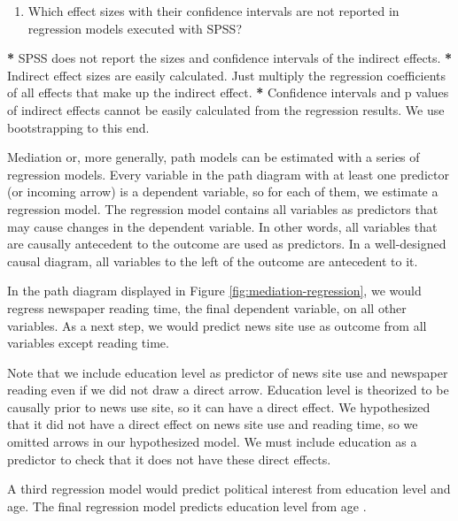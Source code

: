 \documentclass[a4paper]{book}
\newenvironment{Shaded}{\begin{snugshade}}{\end{snugshade}}
\newcommand{\StringTok}[1]{\textcolor[rgb]{0.00,0.00,0.00}{#1}}
\newcommand{\OperatorTok}[1]{\textcolor[rgb]{0.00,0.00,0.00}{\textbf{#1}}}
\newcommand{\NormalTok}[1]{#1}
\providecommand{\tightlist}{%
  \setlength{\itemsep}{0pt}\setlength{\parskip}{0pt}}
\theoremstyle{definition}
\theoremstyle{definition}
\theoremstyle{definition}
\theoremstyle{remark}
\begin{document}
\begin{enumerate}
\def\labelenumi{\arabic{enumi}.}
\setcounter{enumi}{2}
\tightlist
\item
  Which effect sizes with their confidence intervals are not reported in
  regression models executed with SPSS?
\end{enumerate}

\begin{Shaded}
\begin{Highlighting}[]
\OperatorTok{*}\StringTok{ }\NormalTok{SPSS does not report the sizes and confidence intervals of the indirect effects.}
\OperatorTok{*}\StringTok{ }\NormalTok{Indirect effect sizes are easily calculated. Just multiply the regression}
\NormalTok{coefficients of all effects that make up the indirect effect.}
\OperatorTok{*}\StringTok{ }\NormalTok{Confidence intervals and p values of indirect effects cannot be easily}
\NormalTok{calculated from the regression results. We use bootstrapping to this end.}
\end{Highlighting}
\end{Shaded}

Mediation or, more generally, path models can be estimated with a series
of regression models. Every variable in the path diagram with at least
one predictor (or incoming arrow) is a dependent variable, so for each
of them, we estimate a regression model. The regression model contains
all variables as predictors that may cause changes in the dependent
variable. In other words, all variables that are causally antecedent to
the outcome are used as predictors. In a well-designed causal diagram,
all variables to the left of the outcome are antecedent to it.

In the path diagram displayed in Figure \ref{fig:mediation-regression},
we would regress newspaper reading time, the final dependent variable,
on all other variables. As a next step, we would predict news site use
as outcome from all variables except reading time.

Note that we include education level as predictor of news site use and
newspaper reading even if we did not draw a direct arrow. Education
level is theorized to be causally prior to news use site, so it can have
a direct effect. We hypothesized that it did not have a direct effect on
news site use and reading time, so we omitted arrows in our hypothesized
model. We must include education as a predictor to check that it does
not have these direct effects.

A third regression model would predict political interest from education
level and age. The final regression model predicts education level from
age .
\end{document}
